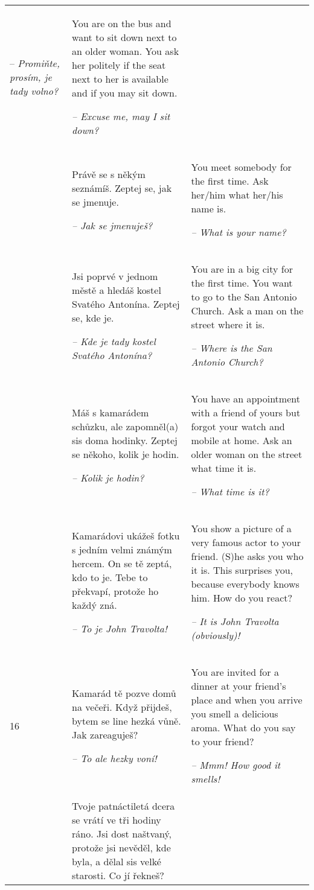 \begin{xltabular}{\textwidth}{lQQ}
-- \textit{Promiňte, prosím, je tady volno?} & You are on the bus and want to sit down next to an older woman. You ask her politely if the seat next to her is available and if you may sit down.

{\itshape -- Excuse me, may I sit down?}\\
 & Právě se s někým seznámíš. Zeptej se, jak se jmenuje.

{\itshape -- Jak se jmenuješ?} & You meet somebody for the first time. Ask her/him what her/his name is.

{\itshape -- What is your name?}\\
 & Jsi poprvé v jednom městě a hledáš kostel Svatého Antonína. Zeptej se, kde je.

{\itshape -- Kde je tady kostel Svatého Antonína?} & You are in a big city for the first time. You want to go to the San Antonio Church. Ask a man on the street where it is.

{\itshape -- Where is the San Antonio Church?}\\
 & Máš s kamarádem schůzku, ale zapomněl(a) sis doma hodinky. Zeptej se někoho, kolik je hodin.

{\itshape -- Kolik je hodin?} & You have an appointment with a friend of yours but forgot your watch and mobile at home. Ask an older woman on the street what time it is.

{\itshape -- What time is it?}\\
 & Kamarádovi ukážeš fotku s jedním velmi známým hercem. On se tě zeptá, kdo to je. Tebe to překvapí, protože ho každý zná.

{\itshape -- To je John Travolta!} & You show a picture of a very famous actor to your friend. (S)he asks you who it is. This surprises you, because everybody knows him. How do you react?

{\itshape -- It is John Travolta (obviously)!}\\
16 & Kamarád tě pozve domů na večeři. Když přijdeš, bytem se line hezká vůně. Jak zareaguješ?

{\itshape -- To ale hezky voní!} & You are invited for a dinner at your friend’s place and when you arrive you smell a delicious aroma. What do you say to your friend?

{\itshape -- Mmm! How good it smells!}\\
 & Tvoje patnáctiletá dcera se vrátí ve tři hodiny ráno. Jsi dost naštvaný, protože jsi nevěděl, kde byla, a dělal sis velké starosti. Co jí řekneš?


\end{xltabular}
